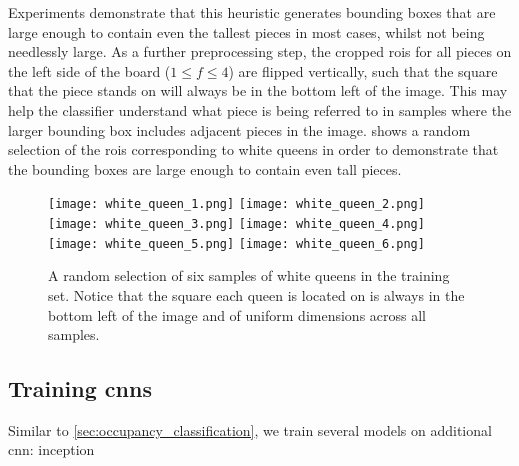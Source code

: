 \documentclass[../main.tex]{subfiles}
\begin{document}
Experiments demonstrate that this heuristic generates bounding boxes that are large enough to contain even the tallest pieces in most cases, whilst not being needlessly large.
As a further preprocessing step, the cropped \glspl{roi} for all pieces on the left side of the board ($1 \leq f \leq 4$) are flipped vertically, such that the square that the piece stands on will always be in the bottom left of the image.
This may help the classifier understand what piece is being referred to in samples where the larger bounding box includes adjacent pieces in the image.
 shows a random selection of the \glspl{roi} corresponding to white queens in order to demonstrate that the bounding boxes are large enough to contain even tall pieces.
\begin{figure}
    \centering
    \texttt{[image: white\_queen\_1.png]}
    \texttt{[image: white\_queen\_2.png]}
    \texttt{[image: white\_queen\_3.png]}
    \texttt{[image: white\_queen\_4.png]}
    \texttt{[image: white\_queen\_5.png]}
    \texttt{[image: white\_queen\_6.png]}
    \caption[A random selection of six samples of white queens in the training set.]{A random selection of six samples of white queens in the training set. Notice that the square each queen is located on is always in the bottom left of the image and of uniform dimensions across all samples.}
    \label{fig:white_queens}
\end{figure}

\subsection{Training \glspl{cnn}}
Similar to \cref{sec:occupancy_classification}, we train several models on 
additional cnn: inception
\end{document}

